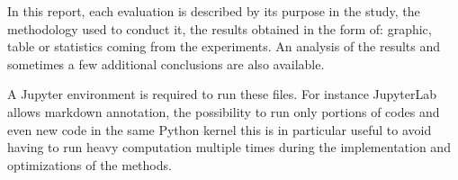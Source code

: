 In this report, each evaluation is described by its purpose in the study, the methodology used to conduct it, the results obtained in the form of: graphic, table or statistics coming from the experiments.
An analysis of the results and sometimes a few additional conclusions are also available.

A Jupyter environment is required to run these files.
For instance JupyterLab allows markdown annotation, the possibility to run only portions of codes and even new code in the same Python kernel this is in particular useful to avoid having to run heavy computation multiple times during the implementation and optimizations of the methods.
